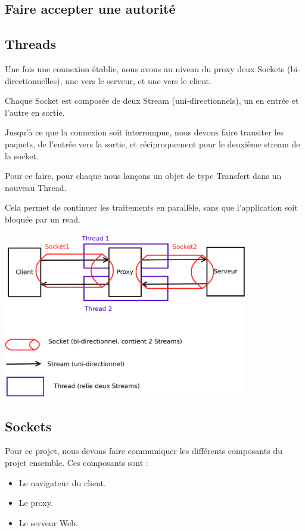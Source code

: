 \documentclass[a4paper,11pt,french]{report}
\begin{document}
\subsection{Faire accepter une autorité}


\subsection{Threads}

Une fois une connexion établie, nous avons au niveau du proxy deux Sockets (bi-directionnelles), une vers le serveur, et une vers le client.

Chaque Socket est composée de deux Stream (uni-directionnels), un en entrée et l'autre en sortie.

Jusqu'à ce que la connexion soit interrompue, nous devons faire transiter les paquets, de l'entrée vers la sortie, et réciproquement pour le deuxième stream de la socket.

Pour ce faire, pour chaque nous lançons un objet de type Transfert dans un nouveau Thread.

Cela permet de continuer les traitements en parallèle, sans que l'application soit bloquée par un read.

\includegraphics[width=0.8\textwidth]{images/thread.pdf}

\subsection{Sockets}
Pour ce projet, nous devons faire communiquer les différents composants du projet ensemble. Ces composants sont :
\begin{itemize}
\item Le navigateur du client.
\item Le proxy.
\item Le serveur Web.
\end{itemize}
\end{document}
